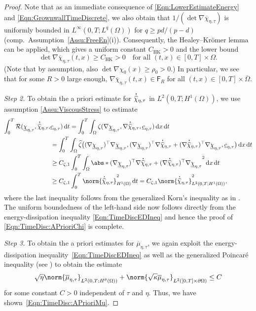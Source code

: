 \documentclass[a4paper,12pt]{article}
\newcommand{\pl}{\partial}
\newcommand{\wh}{\widehat}
\newcommand{\ubar}{\underline}
\newcommand{\dx}{\mathrm{\,d}x}
\newcommand{\dt}{\mathrm{\,d}t}
\newcommand{\dd}{\mathrm{\,d}}
\newcommand{\chibar}{\overline{\chi}}
\newcommand{\chihat}{\widehat{\chi}}
\newcommand{\mubar}{\overline{\mu}}
\newcommand\DT[1]{\mathchoice
                 {{\buildrel{\hspace*{.1em}\text{\LARGE.}}\over{#1}}}
                 {{\buildrel{\hspace*{.1em}\text{\Large.}}\over{#1}}}
                 {{\buildrel{\hspace*{.1em}\text{\large.}}\over{#1}}}
                 {{\buildrel{\hspace*{.1em}\text{\large.}}\over{#1}}}}
\renewcommand{\dot}{\DT}
\newcommand{\calR}{\mathcal{R}}
\theoremstyle{plain}
\theoremstyle{definition}
\numberwithin{equation}{section}
\begin{document}
\begin{proof}
%
%
%
%
Note that as an immediate consequence of \eqref{Eqn:LowerEstimateEnergy}  and  \eqref{Eqn:GrownwallTimeDiscrete}, 
we also obtain that $1/(\det\nabla\chibar_{\eta,\tau})$ is uniformly
bounded in $L^\infty(0,T;L^q(\Omega))$ for $q\geq pd/(p{-}d)$
(comp.\ Assumption~\ref{Assu:FreeEn}(i)). Consequently, the
Healey--Kr\"omer lemma \cite[Thm.~3.1]{MieRou2020TVKVR} can be
applied, which gives a uniform constant $C_{\text{HK}}>0$ and the
lower bound 
\[
\det\nabla\chibar_{\eta,\tau}(t,x) \geq C_\text{HK}>0\quad\text{for all }(t,x)\in[0,T]\times\Omega.
\] 
(Note that by assumption, also $\det\nabla \chi_0(x)\geq \rho_0>0$.)
In particular, we see that for some $R>0$ large enough, 
$\nabla\chibar_{\eta,\tau}(t,x) \in \mathsf{F}_R$ for all $(t,x)\in[0,T]\times\overline\Omega$. \medskip



\emph{Step 2.} To obtain the a priori estimate for $\dot\chihat_{\eta,\tau}$ in $L^2(0,T;H^1(\Omega))$, we use assumption \ref{Assu:ViscousStress} to estimate
\begin{align*}
\int_0^T\calR(\ubar\chi_{\eta,\tau},\dot\chihat_{\eta,\tau},&\ubar c_{\eta,\tau})\dt
    = \int_0^T\int_\Omega \zeta(\nabla\ubar\chi_{\eta,\tau},\nabla\dot\chihat_{\eta,\tau}, \ubar c_{\eta,\tau})\dx\dt\\
    &= \int_0^T\int_\Omega \wh\zeta\big((\nabla\ubar\chi_{\eta,\tau})^\top \nabla\ubar\chi_{\eta,\tau}, (\nabla\ubar\chi_{\eta,\tau})^\top \nabla\dot\chihat_{\eta,\tau} 
    + (\nabla\dot\chihat_{\eta,\tau})^\top \nabla\ubar\chi_{\eta,\tau}, \ubar c_{\eta,\tau}\big)\dx\dt\\
    &\geq C_{\zeta,1}\int_0^T \int_\Omega \abs*{(\nabla\ubar\chi_{\eta,\tau})^\top \nabla\dot\chihat_{\eta,\tau} 
+ (\nabla\dot\chihat_{\eta,\tau})^\top \nabla\ubar\chi_{\eta,\tau}}^2\dd x\dt\\
    &\geq C_{\zeta,1}\int_0^T \norm{\dot\chihat_{\eta,\tau}}^2_{H^1(\Omega)}\dt 
= C_{\zeta,1}\norm{\dot\chihat_{\eta,\tau}}^2_{L^2(0,T;H^1(\Omega))},
\end{align*}
		where the last inequality follows from the generalized Korn's inequality as in \cite[Cor.~3.4]{MieRou2020TVKVR}. %
        The uniform boundedness of the left-hand side now follows directly from the energy-dissipation inequality \eqref{Eqn:TimeDiscEDIneq} and hence the proof of \eqref{Eqn:TimeDisc:APrioriChi} is complete.
		\medskip



  
  
		\emph{Step 3.} To obtain the a priori estimates for $\mubar_{\eta,\tau}$, 
we again exploit the energy-dissipation inequality~\eqref{Eqn:TimeDiscEDIneq}  
as well as the generalized Poincar\'{e} inequality (see \cite[Section\ 2.1.4]{Tema1997IDDS}) to obtain the estimate
\[
\sqrt{\eta}\norm{\mubar_{\eta,\tau}}_{L^2(0,T;H^\theta(\Omega))} + \norm{\sqrt{\kappa}\mubar_{\eta,\tau}}_{L^2([0,T]\times\pl\Omega)}\leq C
\]
for some constant $C>0$ independent of $\tau$ and $\eta$. Thus, we have shown~\eqref{Eqn:TimeDisc:APrioriMu}.


\end{proof}
\end{document}
